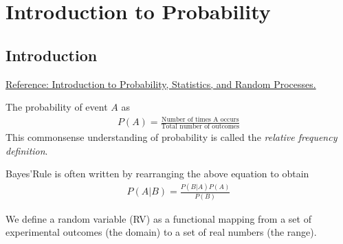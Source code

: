 \chapter{Introduction to Probability}
\section{Introduction}
\label{sec:intro_prob}

\href{https://www.probabilitycourse.com/chapter5/5_2_3_conditioning_independence.php}{Reference: Introduction to Probability, Statistics, and Random Processes.}

The probability of event $A$ as
\begin{align*}
	P(A) = \frac{\text{Number of times A occurs}}{\text{Total number of outcomes}}
\end{align*}
This commonsense understanding of probability is called the \textit{relative frequency definition}.

Bayes'Rule is often written by rearranging the above equation to obtain
\begin{align*}
	P(A|B) = \frac{P(B|A)P(A)}{P(B)}
\end{align*}

We define a random variable (RV) as a functional mapping from a set of experimental outcomes (the domain) to a set of real numbers (the range).

